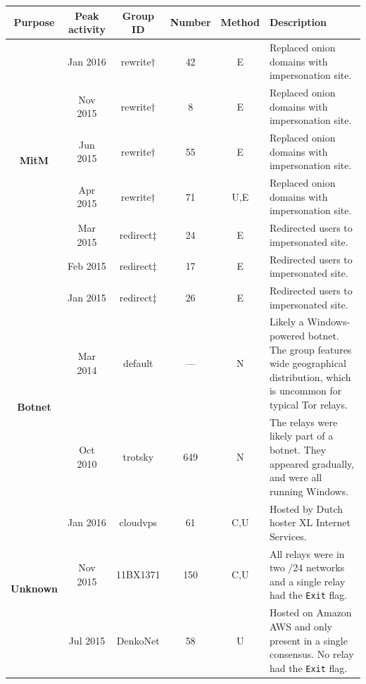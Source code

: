 \begin{table}[ht!]
\small
\centering
\begin{tabularx}{\textwidth}{c|c c c c X}
\hline
\textbf{Purpose} & \textbf{Peak activity} & \textbf{Group ID} & \textbf{Number} &
\textbf{Method} & \textbf{Description} \\
\hline
\multirow{6}{*}{\textbf{MitM}}
& Jan 2016 & rewrite$\dagger$ & 42 & E & Replaced onion domains with
impersonation site. \\

& Nov 2015 & rewrite$\dagger$ & 8 & E & Replaced onion domains with impersonation
site. \\

& Jun 2015 & rewrite$\dagger$ & 55 & E & Replaced onion domains with
impersonation site. \\

& Apr 2015 & rewrite$\dagger$ & 71 & U,E & Replaced onion domains with
impersonation site. \\

& Mar 2015 & redirect$\ddagger$ & 24 & E & Redirected users to impersonated site.
\\

& Feb 2015 & redirect$\ddagger$ & 17 & E & Redirected users to impersonated site.
\\

& Jan 2015 & redirect$\ddagger$ & 26 & E & Redirected users to impersonated site.
\\

\hline

\multirow{2}{*}{\textbf{Botnet}}
& Mar 2014 & default & --- & N & Likely a Windows-powered botnet.  The group
features wide geographical distribution, which is uncommon for typical Tor
relays. \\

& Oct 2010 & trotsky & 649 & N & The relays were likely part of a botnet.  They
appeared gradually, and were all running Windows. \\

\hline

\multirow{5}{*}{\textbf{Unknown}}
& Jan 2016 & cloudvps & 61 & C,U & Hosted by Dutch hoster XL Internet Services. \\

& Nov 2015 & 11BX1371 & 150 & C,U & All relays were in two /24 networks and a single
relay had the \texttt{Exit} flag.  \\

& Jul 2015 & DenkoNet & 58 & U & Hosted on Amazon AWS and only present in a single
consensus.  No relay had the \texttt{Exit} flag. \\


\end{tabularx}
\end{table}
